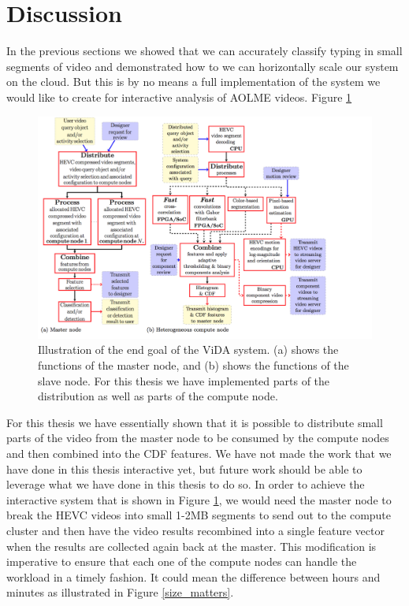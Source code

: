 \section{Discussion}
 In the previous sections we showed that we can accurately classify typing in
 small segments of video and demonstrated how to we can horizontally scale our
 system on the cloud. But this is by no means a full implementation of the system
 we would like to create for interactive analysis of AOLME videos. Figure
 \ref{fig:full_system}

 \begin{figure}[h]
   \label{fig:full_system}
   \centering
   \includegraphics[width=\textwidth]{figures/full_system}
   \caption{Illustration of the end goal of the ViDA system. (a) shows the
   functions of the master node, and (b) shows the functions of the slave node.
   For this thesis we have implemented parts of the distribution as well as parts
   of the compute node.}
 \end{figure}

 \FloatBarrier

 For this thesis we have essentially shown that it is possible to distribute
 small parts of the video from the master node to be consumed by the compute nodes
 and then combined into the CDF features. We have not made the work that we have
 done in this thesis interactive yet, but future work should be able to leverage
 what we have done in this thesis to do so. In order to achieve the interactive
 system that is shown in Figure \ref{fig:full_system}, we would need the master
 node to break the HEVC videos into small 1-2MB segments to send out to the compute
 cluster and then have the video results recombined into a single feature vector
 when the results are collected again back at the master. This modification is
 imperative to ensure that each one of the compute nodes can handle the workload
 in a timely fashion. It could mean the difference between hours and minutes
 as illustrated in Figure \ref{size_matters}.
